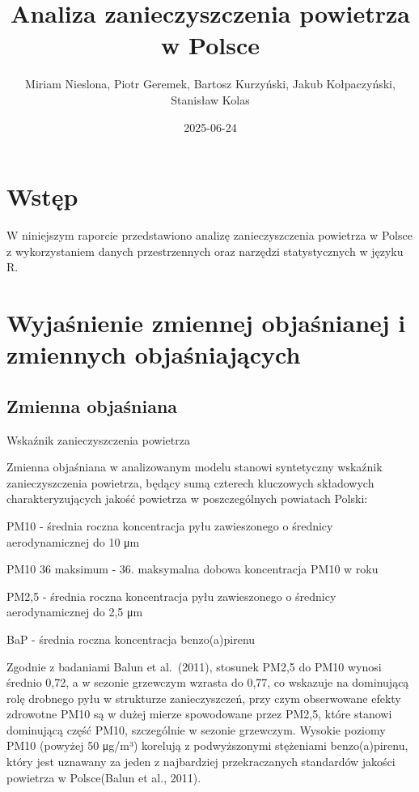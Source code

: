 \documentclass[
  11pt,
]{article}
\title{Analiza zanieczyszczenia powietrza w Polsce}
\author{Miriam Nieslona, Piotr Geremek, Bartosz Kurzyński, Jakub
Kołpaczyński, Stanisław Kolas}
\date{2025-06-24}
\begin{document}
\maketitle

{
\setcounter{tocdepth}{3}
\tableofcontents
}
\section{Wstęp}\label{wstux119p}

W niniejszym raporcie przedstawiono analizę zanieczyszczenia powietrza w
Polsce z wykorzystaniem danych przestrzennych oraz narzędzi
statystycznych w języku R.

\section{Wyjaśnienie zmiennej objaśnianej i zmiennych
objaśniających}\label{wyjaux15bnienie-zmiennej-objaux15bnianej-i-zmiennych-objaux15bniajux105cych}

\subsection{Zmienna objaśniana}\label{zmienna-objaux15bniana}

Wskaźnik zanieczyszczenia powietrza

Zmienna objaśniana w analizowanym modelu stanowi syntetyczny wskaźnik
zanieczyszczenia powietrza, będący sumą czterech kluczowych składowych
charakteryzujących jakość powietrza w poszczególnych powiatach Polski:

PM10 - średnia roczna koncentracja pyłu zawieszonego o średnicy
aerodynamicznej do 10 μm

PM10 36 maksimum - 36. maksymalna dobowa koncentracja PM10 w roku

PM2,5 - średnia roczna koncentracja pyłu zawieszonego o średnicy
aerodynamicznej do 2,5 μm

BaP - średnia roczna koncentracja benzo(a)pirenu

Zgodnie z badaniami Balun et al.~(2011), stosunek PM2,5 do PM10 wynosi
średnio 0,72, a w sezonie grzewczym wzrasta do 0,77, co wskazuje na
dominującą rolę drobnego pyłu w strukturze zanieczyszczeń, przy czym
obserwowane efekty zdrowotne PM10 są w dużej mierze spowodowane przez
PM2,5, które stanowi dominującą część PM10, szczególnie w sezonie
grzewczym. Wysokie poziomy PM10 (powyżej 50 μg/m³) korelują z
podwyższonymi stężeniami benzo(a)pirenu, który jest uznawany za jeden z
najbardziej przekraczanych standardów jakości powietrza w Polsce(Balun
et al., 2011).
\end{document}

